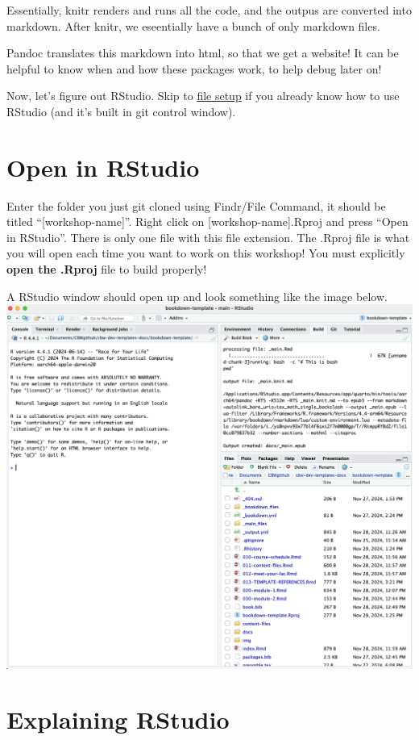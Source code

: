 \documentclass[
]{book}
\theoremstyle{definition}
\theoremstyle{definition}
\theoremstyle{definition}
\theoremstyle{definition}
\theoremstyle{remark}
\begin{document}
Essentially, knitr renders and runs all the code, and the outpus are converted into markdown. After knitr, we eseentially have a bunch of only markdown files.

Pandoc translates this markdown into html, so that we get a website! It can be helpful to know when and how these packages work, to help debug later on!

Now, let's figure out RStudio. Skip to \hyperref[file-setup]{file setup} if you already know how to use RStudio (and it's built in git control window).

\section{Open in RStudio}\label{open-in-rstudio}

Enter the folder you just git cloned using Findr/File Command, it should be titled ``{[}workshop-name{]}''. Right click on {[}workshop-name{]}.Rproj and press ``Open in RStudio''. There is only one file with this file extension. The .Rproj file is what you will open each time you want to work on this workshop! You must explicitly \textbf{open the .Rproj} file to build properly!

A RStudio window should open up and look something like the image below.
\includegraphics{img/files-and-build/newly-opened-RStudio.png}\\

\section{Explaining RStudio}\label{explaining-rstudio}
\end{document}
